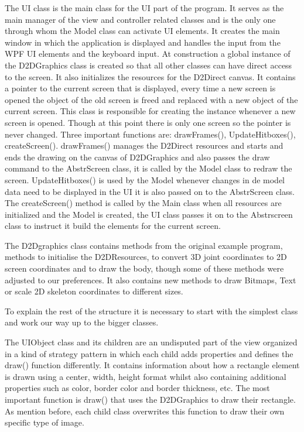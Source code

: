 The UI class is the main class for the UI part of the program. It serves as the main manager of the view and controller related classes and is the only one through whom the Model class can activate UI elements. It creates the main window in which the application is displayed and handles the input from the WPF UI elements and the keyboard input. At construction a global instance of the D2D\textunderscore Graphics class is created so that all other classes can have direct access to the screen. It also initializes the resources for the D2Direct canvas. It contains a pointer to the current screen that is displayed, every time a new screen is opened the object of the old screen is freed and replaced with a new object of the current screen. This class is responsible for creating the instance whenever a new screen is opened. Though at this point there is only one screen so the pointer is never changed. Three important functions are:  drawFrames(), UpdateHitboxes(), createScreen(). drawFrames() manages the D2Direct resources and starts and ends the drawing on the canvas of D2D\textunderscore Graphics and also passes the draw command to the Abstr\textunderscore Screen class, it is called by the Model class to redraw the screen. UpdateHitboxes() is used by the Model whenever changes in de model data need to be displayed in the UI it is also passed on to the Abstr\textunderscore Screen class. The createScreen() method is called by the Main class when all resources are initialized and the Model is created, the UI class passes it on to the Abstr\textunderscore screen class to instruct it build the elements for the current screen.

The D2D\textunderscore graphics class contains methods from the original example program, methods to initialise the D2DResources, to convert 3D joint coordinates to 2D screen coordinates and to draw the body, though some of these methods were adjusted to our preferences. It also contains new methods to draw Bitmaps, Text or scale 2D skeleton coordinates to different sizes. 

To explain the rest of the structure it is necessary to start with the simplest class and work our way up to the bigger classes.

The UI\textunderscore Object class and its children are an undisputed part of the view organized in a kind of strategy pattern in which each child adds properties and defines the draw() function differently. It contains information about how a rectangle element is drawn using a center, width, height format whilst also containing additional properties such as color, border color and border thickness, etc. The most important function is draw() that uses the D2D\textunderscore Graphics to draw their rectangle. As mention before, each child class overwrites this function to draw their own specific type of image.

